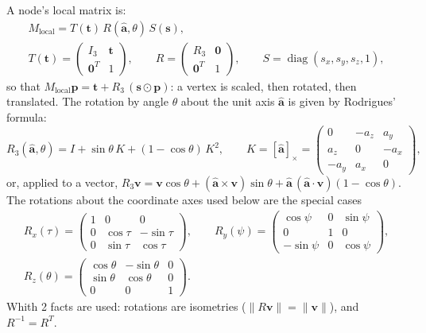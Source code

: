 \documentclass[a4paper, 11pt]{article}
\begin{document}
A node's local matrix is:
\begin{gather*}
  M_{\text{local}} = T(\mathbf t)\,R(\hat{\mathbf a},\theta)\,S(\mathbf s),\\
  T(\mathbf t)=\begin{pmatrix} I_3 & \mathbf t\\ \mathbf 0^{T} & 1\end{pmatrix},\qquad
  R=\begin{pmatrix} R_3 & \mathbf 0\\ \mathbf 0^{T} & 1\end{pmatrix},\qquad
  S=\operatorname{diag}(s_x,s_y,s_z,1),
\end{gather*}
so that $M_{\text{local}}\mathbf p=\mathbf t+R_3\,(\mathbf s\odot\mathbf p)$: a vertex is scaled, then rotated, then translated.
The rotation by angle $\theta$ about the unit axis $\hat{\mathbf a}$  is given by Rodrigues' formula:
\begin{equation}
  R_3(\hat{\mathbf a},\theta)=I+\sin\theta\,K+(1-\cos\theta)\,K^2,\qquad
  K=[\hat{\mathbf a}]_\times=\begin{pmatrix}0&-a_z&a_y\\a_z&0&-a_x\\-a_y&a_x&0\end{pmatrix},
  \label{eq:rodrigues}
\end{equation}
or, applied to a vector, $R_3\mathbf v=\mathbf v\cos\theta+(\hat{\mathbf a}\times\mathbf v)\sin\theta+\hat{\mathbf a}\,(\hat{\mathbf a}\cdot\mathbf v)(1-\cos\theta)$.
The rotations about the coordinate axes used below are the special cases
\begin{gather*}
  R_x(\tau)=\begin{pmatrix}1&0&0\\0&\cos\tau&-\sin\tau\\0&\sin\tau&\cos\tau\end{pmatrix},\qquad
  R_y(\psi)=\begin{pmatrix}\cos\psi&0&\sin\psi\\0&1&0\\-\sin\psi&0&\cos\psi\end{pmatrix},\\
  R_z(\theta)=\begin{pmatrix}\cos\theta&-\sin\theta&0\\\sin\theta&\cos\theta&0\\0&0&1\end{pmatrix}.
\end{gather*}
Whith 2 facts are used: rotations are isometries ($\|R\mathbf v\|=\|\mathbf v\|$), and $R^{-1}=R^{T}$.
\end{document}
